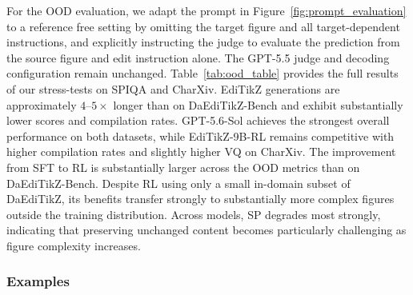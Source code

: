 For the OOD evaluation, we adapt the prompt in Figure~\ref{fig:prompt_evaluation} to a reference free setting by omitting the target figure and all target-dependent instructions, and explicitly instructing the judge to evaluate the prediction from the source figure and edit instruction alone. The GPT-5.5 judge and decoding configuration remain unchanged. Table~\ref{tab:ood_table} provides the full results of our stress-tests on SPIQA and CharXiv. EdiTikZ generations are approximately $4$--$5\times$ longer than on DaEdiTikZ-Bench and exhibit substantially lower scores and compilation rates. GPT-5.6-Sol achieves the strongest overall performance on both datasets, while EdiTikZ-9B-RL remains competitive with higher compilation rates and slightly higher VQ on CharXiv. The improvement from SFT to RL is substantially larger across the OOD metrics than on DaEdiTikZ-Bench. Despite RL using only a small in-domain subset of DaEdiTikZ, its benefits transfer strongly to substantially more complex figures outside the training distribution. Across models, SP degrades most strongly, indicating that preserving unchanged content becomes particularly challenging as figure complexity increases.



\subsubsection{Examples}
\label{subsubsec:Examples}











